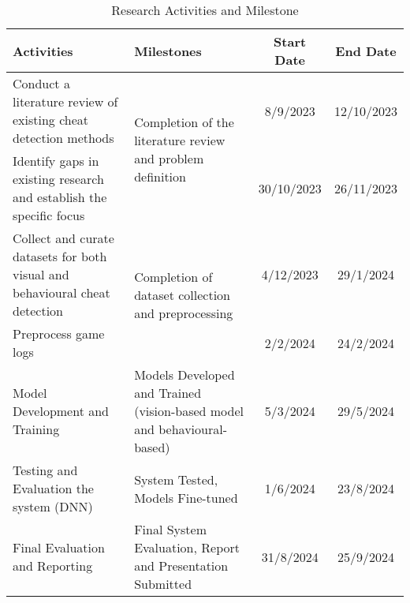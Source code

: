 \documentclass[a4paper, 12pt]{article}
\begin{document}
\begin{table}[H]
    \centering
    \begin{tabular}{|m{7cm}|m{5cm}|c|c|}
        \hline
        \textbf{Activities} & \textbf{Milestones} & \textbf{Start Date} & \textbf{End Date} \\ \hline
        Conduct a literature review of existing cheat detection methods & \multirow{2}{*}{\parbox{5cm}{Completion of the literature review and problem definition}} & 8/9/2023 & 12/10/2023 \\ \cline{1-1} \cline{3-4}
        Identify gaps in existing research and establish the specific focus & & 30/10/2023 & 26/11/2023 \\ \hline
        Collect and curate datasets for both visual and behavioural cheat detection & \multirow{2}{*}{\parbox{5cm}{Completion of dataset collection and preprocessing}} & 4/12/2023 & 29/1/2024 \\ \cline{1-1} \cline{3-4}
        Preprocess game logs &  & 2/2/2024 & 24/2/2024 \\ \hline
        Model Development and Training & Models Developed and Trained (vision-based model and behavioural-based) & 5/3/2024 & 29/5/2024 \\ \hline
        Testing and Evaluation the system (DNN) & System Tested, Models Fine-tuned & 1/6/2024 & 23/8/2024 \\ \hline
        Final Evaluation and Reporting & Final System Evaluation, Report and Presentation Submitted & 31/8/2024 & 25/9/2024 \\ \hline
    \end{tabular}
    \caption{Research Activities and Milestone}
    \label{tab:research_activities}
\end{table}
\end{document}
